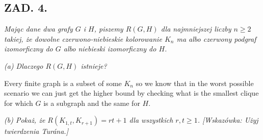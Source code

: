\documentclass{article}[13pt]
\begin{document}
\subsection*{ZAD. 4.}
\emph{Mając dane dwa grafy $G$ i $H$, piszemy $R(G, H)$ dla najmniejszej liczby $n\geq2$ takiej, że dowolne czerwono-niebieskie kolorowanie $K_n$ ma albo czerwony podgraf izomorficzny do $G$ albo niebieski izomorficzny do $H$.}

\emph{(a) Dlaczego $R(G, H)$ istnieje?}
\smallskip

Every finite graph is a subset of some $K_n$ so we know that in the worst possible scenario we can just get the higher bound by checking what is the smallest clique for which $G$ is a subgraph and the same for $H$.
\medskip

\emph{(b) Pokaż, że $R(K_{1,t}, K_{r+1})=rt+1$ dla wszystkich $r,t\geq1$. [Wskazówka: Użyj twierdzenia Tur\'ana.]}
\end{document}
